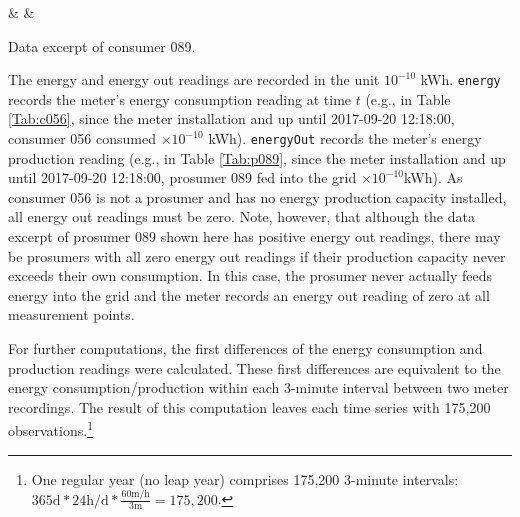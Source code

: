 \begin{table}[htbp]
    {\csvcolii & \csvcoliii & \csvcoliv}%
    \caption[Data excerpt of prosumer 089]{Data excerpt of consumer 089. \quantnet}
    \label{Tab:p089}
\end{table}

The energy and energy out readings are recorded in the unit $10^{-10}$ kWh. \texttt{energy} records the meter's energy consumption reading at time $t$ (e.g., in Table \ref{Tab:c056}, since the meter installation and up until 2017-09-20 12:18:00, consumer 056 consumed %
{\csvcoliii}$\times 10^{-10}$ kWh). \texttt{energyOut} records the meter's energy production reading (e.g., in Table \ref{Tab:p089}, since the meter installation and up until 2017-09-20 12:18:00, prosumer 089 fed into the grid %
{\csvcoliii}$\times 10^{-10}$kWh). As consumer 056 is not a prosumer and has no energy production capacity installed, all energy out readings must be zero. Note, however, that although the data excerpt of prosumer 089 shown here has positive energy out readings, there may be prosumers with all zero energy out readings if their production capacity never exceeds their own consumption. In this case, the prosumer never actually feeds energy into the grid and the meter records an energy out reading of zero at all measurement points.

For further computations, the first differences of the energy consumption and production readings were calculated. These first differences are equivalent to the energy consumption/production within each 3-minute interval between two meter recordings. The result of this computation leaves each time series with 175,200 observations.\footnote{One regular year (no leap year) comprises 175,200 3-minute intervals: $365\text{d} * 24\text{h/d} * \frac{60\text{m/h}}{3\text{m}} = 175,200$.}



